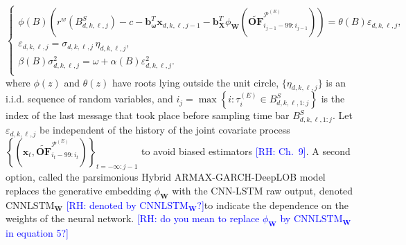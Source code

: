 \documentclass[10pt,a4paper,oneside]{article}
\newcommand{\rh}[1]{\textcolor{blue}{\textsf{[RH: #1]}}}
\begin{document}
\begin{equation}
    \begin{cases}
        \phi(B) \left( r^w \left( B^S_{d, k, \ell, j} \right) - c - \mathbf{b}_{\boldsymbol{\omega}}^T \mathbf{x}_{d, k, \ell, j - 1} - \mathbf{b}^T_{\mathbf{X}}\phi_{\mathbf{W}} \left( \widetilde{\mathbf{OF}}^{\mathcal{P}^{(E)}}_{i_{j - 1} - 99:i_{j - 1}} \right) \right) = \theta(B) \varepsilon_{d, k, \ell, j}, \\[6pt]
        \varepsilon_{d, k, \ell, j} = \sigma_{d, k, \ell, j} \,\eta_{d, k, \ell, j},                                                                                                                                                                                                                                      \\[6pt]
        \beta(B) \sigma_{d, k, \ell, j}^2 = \omega + \alpha(B) \varepsilon^2_{d, k, \ell, j}.                                                                                                                                                                                                                             \\
    \end{cases}
    \label{eq:hybrid_armax_garch}
\end{equation}
where \(\phi(z)\) and \(\theta(z)\) have roots lying outside the unit circle, \(\{\eta_{d, k, \ell, j}\}\) is an i.i.d. sequence of random variables, and $i_j = \max\left\{i : \tau^{(E)}_{i} \in B^S_{d, k, \ell, 1:j} \right\}$ is the index of the last message that took place before sampling time bar $B^S_{d, k, \ell, 1:j}$. Let \(\varepsilon_{d, k, \ell, j}\) be independent of the history of the joint covariate process \( \left\{ \left( \mathbf{x}_t, \widetilde{\mathbf{OF}}^{\mathcal{P}^{(E)}}_{i_{t} - 99:i_{t}} \right) \right\}_{t = -\infty : j - 1}\) to avoid biased estimators \citep[ch.~9]{hamilton_time_1994} \rh{Ch.~9}. A second option, called the parsimonious Hybrid ARMAX-GARCH-DeepLOB model replaces the generative embedding $\phi_{\mathbf{W}}$ with the CNN-LSTM raw output, denoted $\mathrm{CNNLSTM}_{\mathbf{W}}$ \rh{denoted by $\mathrm{CNNLSTM}_{\mathbf{W}}$?}to indicate the dependence on the weights of the neural network. \rh{do you mean to replace $\phi_{\mathbf{W}}$ by $\mathrm{CNNLSTM}_{\mathbf{W}}$ in equation 5?}

\end{document}
